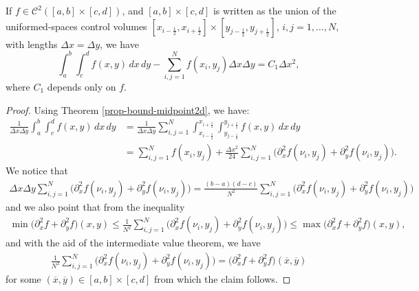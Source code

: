 \begin{corollary}
	\label{anexo-mdp-2d}
	If $f\in \mathcal{C}^2([a,b]\times[c,d])$, and $[a,b]\times[c,d]$ is written
	as the union of the uniformed-spaces control volumes $[x_{i-\frac{1}{2}},x_{i+\frac{1}{2}}] \times  [y_{j-\frac{1}{2}},y_{j+\frac{1}{2}}]$,
	$i,j=1, \ldots, N$,
	with lengths $\Delta x= \Delta y$, we have
	\begin{equation}
	\int_{a}^{b}\int_{c}^{d}
	{f(x,y)\,dx \,dy}-\sum_{i,j=1}^Nf(x_i,y_j) {\Delta x \Delta y} = C_1 \Delta x^2, 
\end{equation}
where $C_1$ depends only on $f$.
\end{corollary}
\begin{proof}
Using Theorem \ref{prop-bound-midpoint2d}, we have:
\begin{align*}
\frac{1}{\Delta x \Delta y}
\int_{a}^{b}\int_{c}^{d} {f(x,y)\,dx \,dy} &=
\frac{1}{\Delta x \Delta y} \sum_{i,j=1}^N
\int_{x_{i-\frac{1}{2}}}^{x_{i+\frac{1}{2}}}
\int_{y_{j-\frac{1}{2}}}^{y_{j+\frac{1}{2}}} {f(x,y)\,dx \,dy}\\
 &= 
\sum_{i,j=1}^N {f(x_i,y_j)} +
\frac{\Delta x^2}{24} \sum_{i,j=1}^N  \bigg({\partial^2_x f(\nu_i,y_j)}+{\partial^2_y f(\nu_i,y_j)}\bigg).
\end{align*}
We notice that
\begin{align*}
{\Delta x \Delta y}
\sum_{i,j=1}^N \bigg(\partial^2_x f(\nu_i,y_j)+\partial^2_y f(\nu_i,y_j)\bigg) = 
\frac{(b-a)(d-c)}{N^2}
\sum_{i,j=1}^N \bigg(\partial^2_x f(\nu_i,y_j)+\partial^2_y f(\nu_i,y_j)\bigg) 
\end{align*}
and we also point that from the inequality
\begin{align*}
	\min{ \big(\partial^2_x f+\partial^2_y f\big)(x,y)} \leq
	\frac{1}{N^2}
	\sum_{i,j=1}^N \bigg(\partial^2_x f(\nu_i,y_j)+\partial^2_y f(\nu_i,y_j)\bigg) 
	\leq \max{ \big(\partial^2_x f+\partial^2_y f\big)(x,y)},
\end{align*}
and with the aid of the intermediate value theorem, we have
\begin{align*}
	\frac{1}{N^2}
	\sum_{i,j=1}^N \bigg(\partial^2_x f(\nu_i,y_j)+\partial^2_y f(\nu_i,y_j)\bigg) 
	= \big(\partial^2_x f+\partial^2_y f\big)(\overline{x},\overline{y}) 
\end{align*}
for some $(\overline{x},\overline{y}) \in [a,b]\times[c,d]$ from which the claim follows.
\end{proof}
